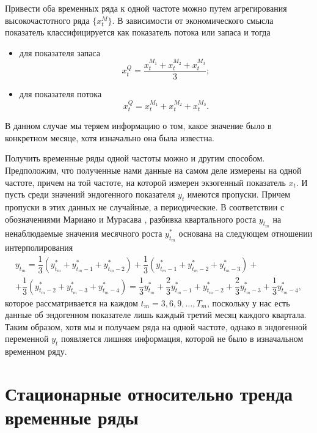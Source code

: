 \documentclass[a4paper, 14pt]{extreport}
\numberwithin{equation}{section}
\numberwithin{equation}{section}
\begin{document}
	Привести оба временных ряда к одной частоте можно путем агрегирования высокочастотного ряда $\{x_t^M\}$. В зависимости от экономического смысла показатель классифицируется как показатель потока или запаса и тогда
	\begin{itemize}
		\item для показателя запаса
		\begin{equation}
			x_t^{Q} = \dfrac{x_t^{M_1} + x_t^{M_2} + x_t^{M_3}}{3};
		\end{equation}
		\item для показателя потока
		\begin{equation}
			\label{eq:sum-obs}
			x_t^{Q} = x_t^{M_1} + x_t^{M_2} + x_t^{M_3}.
		\end{equation}
	\end{itemize}
	В данном случае мы теряем информацию о том, какое значение было в конкретном месяце, хотя изначально она была известна.
	
	Получить временные ряды одной частоты можно и другим способом. Предположим, что полученные нами данные на самом деле измерены на одной частоте, причем на той частоте, на которой измерен экзогенный показатель $x_t$. И пусть среди значений эндогенного показателя $y_t$ имеются пропуски. Причем пропуски в этих данных не случайные, а периодические.
	В соответствии с обозначениями Мариано и Мурасава \cite{9}, разбивка квартального роста $y_{t_m}$ на ненаблюдаемые значения месячного роста $y^*_{t_m}$ основана на следующем отношении интерполирования
	\begin{multline}
		y_{t_m} = \dfrac{1}{3}(y^*_{t_m} + y^*_{t_m-1} + y^*_{t_m-2}) + \dfrac{1}{3}(y^*_{t_m-1} + y^*_{t_m-2} + y^*_{t_m-3}) +\\+ \dfrac{1}{3}(y^*_{t_m-2} + y^*_{t_m-3} + y^*_{t_m-4}) = \dfrac{1}{3} y^*_{t_m} + \dfrac{2}{3} y^*_{t_m-1} + y^*_{t_m-2} + \dfrac{2}{3} y^*_{t_m-3} + \dfrac{1}{3} y^*_{t_m-4},
	\end{multline}
	которое рассматривается на каждом $t_m = 3,6,9,\ldots, T_m$, поскольку у нас есть данные об эндогенном показателе лишь каждый третий месяц каждого квартала. 
	Таким образом, хотя мы и получаем ряда на одной частоте, однако в эндогенной переменной $y_t$ появляется лишняя информация, которой не было в изначальном временном ряду.
	
	\section{Стационарные относительно тренда временные ряды}
	
\end{document}
